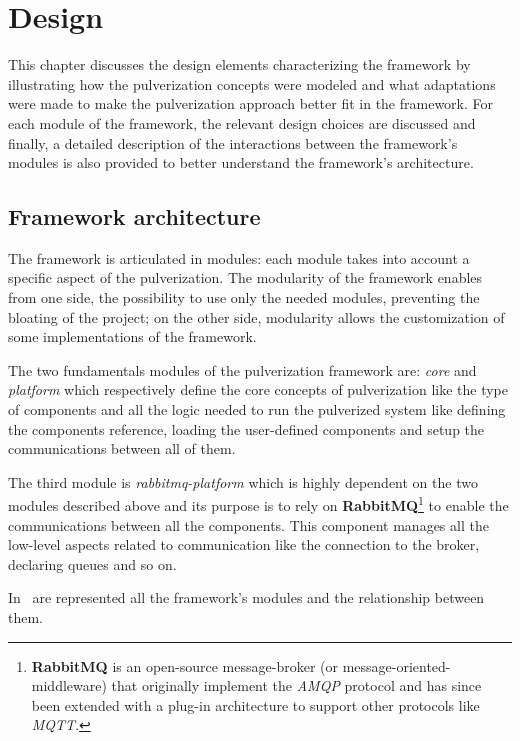 \chapter{Design} %
\label{chap:design}

This chapter discusses the design elements characterizing the framework by illustrating how the pulverization concepts were modeled and what 
adaptations were made to make the pulverization approach better fit in the framework.
For each module of the framework, the relevant design choices are discussed and finally, a detailed description of the interactions between the framework's modules is also provided to better understand the framework's architecture.

\section{Framework architecture}
\label{sec:arch-design}

The framework is articulated in modules: each module takes into account a specific aspect of the pulverization.
The modularity of the framework enables from one side, the possibility to use only the needed modules, preventing the bloating of the project;
on the other side, modularity allows the customization of some implementations of the framework.

The two fundamentals modules of the pulverization framework are: \emph{core} and \emph{platform} which respectively define the core concepts
of pulverization like the type of components and all the logic needed to run the pulverized system like defining the components reference,
loading the user-defined components and setup the communications between all of them.

The third module is \emph{rabbitmq-platform} which is highly dependent on the two modules described above and its purpose is to rely on
\textbf{RabbitMQ}\footnote{\textbf{RabbitMQ} is an open-source message-broker (or message-oriented-middleware) that originally implement
	the \emph{AMQP} protocol and has since been extended with a plug-in architecture to support other protocols like \emph{MQTT}.} to enable
the communications between all the components.
This component manages all the low-level aspects related to communication like the connection to the broker, declaring queues and so on.

In~ are represented all the framework's modules and the relationship between them.

